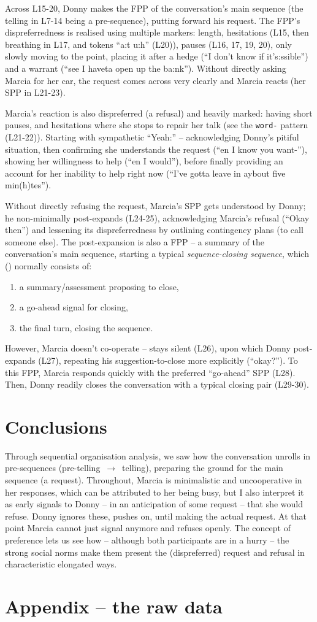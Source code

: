 \documentclass[11pt]{article}
\begin{document}
{	Across L15-20, Donny makes the FPP of the conversation's main sequence (the telling in L7-14 being a pre-sequence), putting forward his request. The FPP's dispreferredness is realised using multiple markers: length, hesitations (L15, then breathing in L17, and tokens ``a:t u:h'' (L20)), pauses (L16, 17, 19, 20), only slowly moving to the point, placing it after a hedge (``I don't know if it's:ssible'') and a warrant (``see I haveta open up the ba:nk''). Without directly asking Marcia for her car, the request comes across very clearly and Marcia reacts (her SPP in L21-23).

	Marcia's reaction is also dispreferred (a refusal) and heavily marked: having short pauses, and hesitations where she stops to repair her talk (see the \verb|word-| pattern (L21-22)). Starting with sympathetic ``Yeah:'' -- acknowledging Donny's pitiful situation, then confirming she understands the request (``en I know you want-''), showing her willingness to help (``en I would''), before finally providing an account for her inability to help right now (``I've gotta leave in aybout five min(h)tes'').

	Without directly refusing the request, Marcia's SPP gets understood by Donny; he non-minimally post-expands (L24-25), acknowledging Marcia's refusal (``Okay then'') and lessening its dispreferredness by outlining contingency plans (to call someone else). The post-expansion is also a FPP -- a summary of the conversation's main sequence, starting a typical \textit{sequence-closing sequence}, which (\citeauthor[p.~168]{Liddicoat_2007}) normally consists of:
	\begin{enumerate}
		\item a summary/assessment proposing to close,
		\item a go-ahead signal for closing,
		\item the final turn, closing the sequence.
	\end{enumerate}
	However, Marcia doesn't co-operate -- stays silent (L26), upon which Donny post-expands (L27), repeating his suggestion-to-close more explicitly (``okay?''). To this FPP, Marcia responds quickly with the preferred ``go-ahead'' SPP (L28). Then, Donny readily closes the conversation with a typical closing pair (L29-30).
}

\section*{Conclusions}{
	Through sequential organisation analysis, we saw how the conversation unrolls in pre-sequences (pre-telling~$\rightarrow$~telling), preparing the ground for the main sequence (a request). Throughout, Marcia is minimalistic and uncooperative in her responses, which can be attributed to her being busy, but I also interpret it as early signals to Donny -- in an anticipation of some request -- that she would refuse. Donny ignores these, pushes on, until making the actual request. At that point Marcia cannot just signal anymore and refuses openly. The concept of preference lets us see how -- although both participants are in a hurry -- the strong social norms make them present the (dispreferred) request and refusal in characteristic elongated ways.
}




\clearpage
\section*{Appendix -- the raw data}{
	
}
\end{document}
